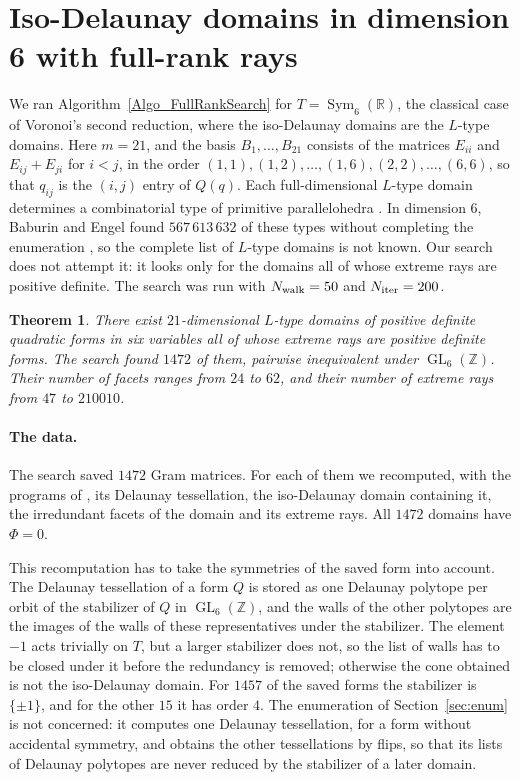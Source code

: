\documentclass{amsart}
\newtheorem{theorem}{Theorem}
\newcommand{\Sym}{\operatorname{Sym}}
\newcommand{\GL}{\operatorname{GL}}
\newcommand{\ZZ}{\mathbb{Z}}
\newcommand{\RR}{\mathbb{R}}
\begin{document}
\section{Iso-Delaunay domains in dimension 6 with full-rank rays}
\label{sec:dim6}

We ran Algorithm~\ref{Algo_FullRankSearch} for \(T=\Sym_6(\RR)\), the
classical case of Voronoi's second reduction, where the iso-Delaunay domains
are the \(L\)-type domains.  Here \(m=21\), and the basis \(B_1,\ldots,B_{21}\)
consists of the matrices \(E_{ii}\) and \(E_{ij}+E_{ji}\) for \(i<j\), in the
order \((1,1),(1,2),\ldots,(1,6),(2,2),\ldots,(6,6)\), so that \(q_{ij}\) is
the \((i,j)\) entry of \(Q(q)\).
Each full-dimensional \(L\)-type domain determines a combinatorial type of
primitive parallelohedra \cite{Voronoi1908}.  In dimension \(6\), Baburin
and Engel found \(567\,613\,632\) of these types without completing the
enumeration \cite{BaburinEngel2013}, so the complete list of \(L\)-type
domains is not known.  Our search does not attempt it: it looks
only for the domains all of whose extreme rays are positive definite.
The search was run with \(N_{\rm walk}=50\) and \(N_{\rm iter}=200\).

\begin{theorem}\label{thm:dim6}
There exist \(21\)-dimensional \(L\)-type domains of positive definite
quadratic forms in six variables all of whose extreme rays are positive
definite forms.  The search found \(1472\) of them, pairwise inequivalent
under \(\GL_6(\ZZ)\).  Their number of facets ranges from \(24\) to \(62\),
and their number of extreme rays from \(47\) to \(210010\).
\end{theorem}

\paragraph{The data.}
The search saved \(1472\) Gram matrices.  For each of them we recomputed,
with the programs of \cite{DutourSikiricPolyhedralCommon}, its Delaunay
tessellation, the iso-Delaunay domain containing it, the irredundant facets
of the domain and its extreme rays.  All \(1472\) domains have \(\Phi=0\).

This recomputation has to take the symmetries of the saved form into
account.  The Delaunay tessellation of a form \(Q\) is stored as one Delaunay
polytope per orbit of the stabilizer of \(Q\) in \(\GL_6(\ZZ)\), and the walls
of the other polytopes are the images of the walls of these representatives
under the stabilizer.  The element \(-1\) acts trivially on \(T\), but a
larger stabilizer does not, so the list of walls has to be closed under it
before the redundancy is removed; otherwise the cone obtained is not the
iso-Delaunay domain.  For \(1457\) of the saved forms the stabilizer is
\(\{\pm 1\}\), and for the other \(15\) it has order \(4\).  The
enumeration of Section~\ref{sec:enum} is not concerned: it computes one Delaunay
tessellation, for a form without accidental symmetry, and obtains the other
tessellations by flips, so that its lists of Delaunay polytopes are never
reduced by the stabilizer of a later domain.
\end{document}

